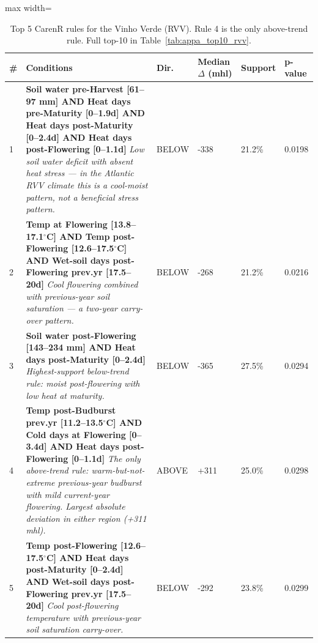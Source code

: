 \begin{table}[!ht]
  \centering
  \caption{Top 5 CarenR rules for the Vinho Verde (RVV). Rule 4 is the only above-trend rule. Full top-10 in Table~\ref{tab:appa_top10_rvv}.}\label{tab:ch4a_2}
  \small
  \begin{adjustbox}{max width=\textwidth}
    \begin{tabularx}{\textwidth}{p{0.4cm}|X|>{\centering\arraybackslash}p{0.9cm}|p{1.3cm}|p{1.2cm}|p{1.2cm}}
  \toprule
  \# & Conditions & Dir. & Median $\Delta$ \newline (mhl) & Support & p-value \\
  \midrule
  1 & \textbf{Soil water pre-Harvest [61--97 mm] AND Heat days pre-Maturity [0--1.9d] AND Heat days post-Maturity [0--2.4d] AND Heat days post-Flowering [0--1.1d]} \newline \textit{Low soil water deficit with absent heat stress — in the Atlantic RVV climate this is a cool-moist pattern, not a beneficial stress pattern.} & {\footnotesize BELOW} & -338 & 21.2\% & 0.0198 \\
  2 & \textbf{Temp at Flowering [13.8--17.1$^\circ$C] AND Temp post-Flowering [12.6--17.5$^\circ$C] AND Wet-soil days post-Flowering prev.yr [17.5--20d]} \newline \textit{Cool flowering combined with previous-year soil saturation — a two-year carry-over pattern.} & {\footnotesize BELOW} & -268 & 21.2\% & 0.0216 \\
  3 & \textbf{Soil water post-Flowering [143--234 mm] AND Heat days post-Maturity [0--2.4d]} \newline \textit{Highest-support below-trend rule: moist post-flowering with low heat at maturity.} & {\footnotesize BELOW} & -365 & 27.5\% & 0.0294 \\
  4 & \textbf{Temp post-Budburst prev.yr [11.2--13.5$^\circ$C] AND Cold days at Flowering [0--3.4d] AND Heat days post-Flowering [0--1.1d]} \newline \textit{The only above-trend rule: warm-but-not-extreme previous-year budburst with mild current-year flowering. Largest absolute deviation in either region (+311 mhl).} & {\footnotesize ABOVE} & +311 & 25.0\% & 0.0298 \\
  5 & \textbf{Temp post-Flowering [12.6--17.5$^\circ$C] AND Heat days post-Maturity [0--2.4d] AND Wet-soil days post-Flowering prev.yr [17.5--20d]} \newline \textit{Cool post-flowering temperature with previous-year soil saturation carry-over.} & {\footnotesize BELOW} & -292 & 23.8\% & 0.0299 \\
  \bottomrule
\end{tabularx}
  \end{adjustbox}

\end{table}



